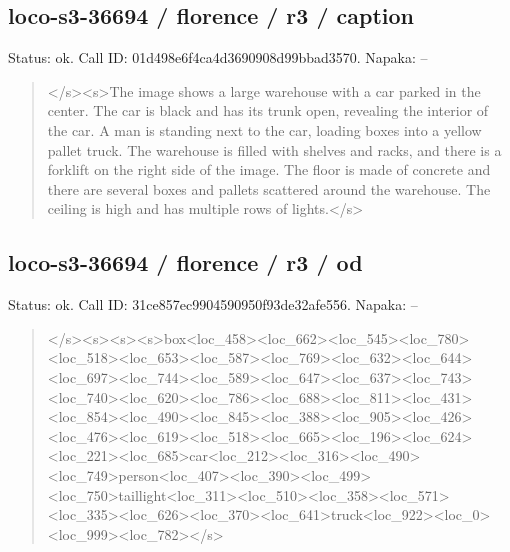 \documentclass[10pt,a4paper]{article}
\begin{document}
\subsection*{loco-s3-36694 / florence / r3 / caption}
Status: ok. Call ID: 01d498e6f4ca4d3690908d99bbad3570. Napaka: --
\begin{quote}\footnotesize
</s>\allowbreak{}<s>\allowbreak{}The image shows a large warehouse with a car parked in the center. The car is black and has its trunk open,\allowbreak{} revealing the interior of the car. A man is standing next to the car,\allowbreak{} loading boxes into a yellow pallet truck. The warehouse is filled with shelves and racks,\allowbreak{} and there is a forklift on the right side of the image. The floor is made of concrete and there are several boxes and pallets scattered around the warehouse. The ceiling is high and has multiple rows of lights.</s>\allowbreak{}
\end{quote}
\subsection*{loco-s3-36694 / florence / r3 / od}
Status: ok. Call ID: 31ce857ec9904590950f93de32afe556. Napaka: --
\begin{quote}\footnotesize
</s>\allowbreak{}<s>\allowbreak{}<s>\allowbreak{}<s>\allowbreak{}box<loc\_458>\allowbreak{}<loc\_66\allowbreak{}2>\allowbreak{}<loc\_545>\allowbreak{}<loc\_780>\allowbreak{}<loc\_518>\allowbreak{}<lo\allowbreak{}c\_653>\allowbreak{}<loc\_587>\allowbreak{}<loc\_769>\allowbreak{}<loc\_632\allowbreak{}>\allowbreak{}<loc\_644>\allowbreak{}<loc\_697>\allowbreak{}<loc\_744>\allowbreak{}<loc\allowbreak{}\_589>\allowbreak{}<loc\_647>\allowbreak{}<loc\_637>\allowbreak{}<loc\_743>\allowbreak{}\allowbreak{}<loc\_740>\allowbreak{}<loc\_620>\allowbreak{}<loc\_786>\allowbreak{}<loc\_\allowbreak{}688>\allowbreak{}<loc\_811>\allowbreak{}<loc\_431>\allowbreak{}<loc\_854>\allowbreak{}<\allowbreak{}loc\_490>\allowbreak{}<loc\_845>\allowbreak{}<loc\_388>\allowbreak{}<loc\_9\allowbreak{}05>\allowbreak{}<loc\_426>\allowbreak{}<loc\_476>\allowbreak{}<loc\_619>\allowbreak{}<l\allowbreak{}oc\_518>\allowbreak{}<loc\_665>\allowbreak{}<loc\_196>\allowbreak{}<loc\_62\allowbreak{}4>\allowbreak{}<loc\_221>\allowbreak{}<loc\_685>\allowbreak{}car<loc\_212>\allowbreak{}\allowbreak{}<loc\_316>\allowbreak{}<loc\_490>\allowbreak{}<loc\_749>\allowbreak{}perso\allowbreak{}n<loc\_407>\allowbreak{}<loc\_390>\allowbreak{}<loc\_499>\allowbreak{}<loc\allowbreak{}\_750>\allowbreak{}taillight<loc\_311>\allowbreak{}<loc\_510>\allowbreak{}\allowbreak{}<loc\_358>\allowbreak{}<loc\_571>\allowbreak{}<loc\_335>\allowbreak{}<loc\_\allowbreak{}626>\allowbreak{}<loc\_370>\allowbreak{}<loc\_641>\allowbreak{}truck<loc\_\allowbreak{}922>\allowbreak{}<loc\_0>\allowbreak{}<loc\_999>\allowbreak{}<loc\_782>\allowbreak{}</s\allowbreak{}>\allowbreak{}
\end{quote}
\end{document}
